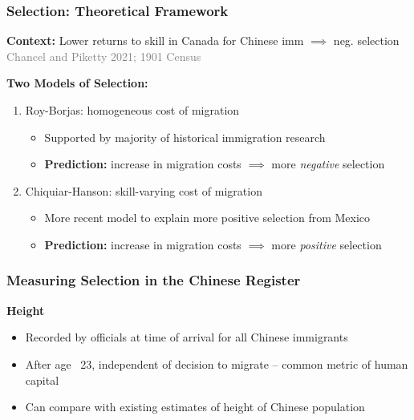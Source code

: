 \documentclass[xcolor=dvipsnames, compress, 12pt, aspectratio=169, handout]{beamer}
\begin{document}
\begin{frame}
    \label{theory_main}
    \frametitle{Selection: Theoretical Framework \hyperlink{theory1}{}}
    \textbf{Context:} Lower returns to skill in Canada for Chinese imm $\implies$ neg. selection \textcolor{gray}{Chancel and Piketty 2021; 1901 Census} \vspace{2mm}

    \textbf{Two Models of Selection:} \vspace{1mm}
    \begin{enumerate}
        \item Roy-Borjas: homogeneous cost of migration \vspace{2mm}
        \begin{itemize}
            \item Supported by majority of historical immigration research \vspace{1mm}
            \item \textbf{Prediction:} increase in migration costs $\implies$ more \textit{negative} selection \vspace{2mm}
        \end{itemize}
        \item Chiquiar-Hanson: skill-varying cost of migration  \vspace{2mm}
        \begin{itemize}
            \item More recent model to explain more positive selection from Mexico \vspace{1mm}
            \item \textbf{Prediction:} increase in migration costs $\implies$ more \textit{positive} selection
        \end{itemize}
    \end{enumerate}
\end{frame}

\begin{frame}
    \frametitle{Measuring Selection in the Chinese Register}
    \textbf{Height} \vspace{2mm}
    \begin{itemize}
        \item Recorded by officials at time of arrival for all Chinese immigrants \vspace{2mm}
        \item After age ~23, independent of decision to migrate -- common metric of human capital  \vspace{2mm}
        \item Can compare with existing estimates of height of Chinese population \vspace{2mm}
    \end{itemize}
\end{frame}
\end{document}
